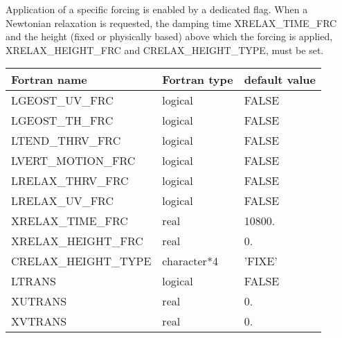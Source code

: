 Application of a specific forcing is enabled by a dedicated flag. When a
Newtonian relaxation is requested, the damping time XRELAX\_TIME\_FRC and the
height (fixed or physically based) above which the forcing is applied,
XRELAX\_HEIGHT\_FRC and CRELAX\_HEIGHT\_TYPE, must be set.

\begin{center}
\begin{tabular} {|l|l|l|}
\hline
Fortran name & Fortran type & default value \\
\hline
LGEOST\_UV\_FRC      & logical      & FALSE \\
LGEOST\_TH\_FRC      & logical      & FALSE \\
LTEND\_THRV\_FRC     & logical      & FALSE \\
LVERT\_MOTION\_FRC   & logical      & FALSE \\
LRELAX\_THRV\_FRC    & logical      & FALSE \\
LRELAX\_UV\_FRC      & logical      & FALSE \\
XRELAX\_TIME\_FRC    & real         & 10800. \\
XRELAX\_HEIGHT\_FRC  & real         & 0. \\
CRELAX\_HEIGHT\_TYPE &  character*4 & 'FIXE' \\
LTRANS               & logical      & FALSE \\
XUTRANS              & real         & 0. \\
XVTRANS              & real         & 0. \\
\hline
\end{tabular}
\end{center}

